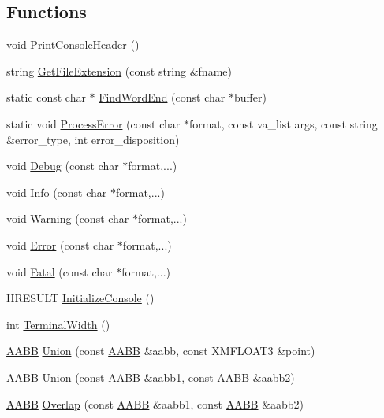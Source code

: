 \subsection*{Functions}
\begin{DoxyCompactItemize}
\item 
void \hyperlink{namespacemage_a064756443bd8a1af6974f22c81d29ed0}{Print\+Console\+Header} ()
\item 
string \hyperlink{namespacemage_aec46035d0a6e15632a44ac88619fb675}{Get\+File\+Extension} (const string \&fname)
\item 
static const char $\ast$ \hyperlink{namespacemage_a81ebde51f9da00dd6fad364a2c5017cb}{Find\+Word\+End} (const char $\ast$buffer)
\item 
static void \hyperlink{namespacemage_a12282bdc04d00e024c5ddf93ed9ad785}{Process\+Error} (const char $\ast$format, const va\+\_\+list args, const string \&error\+\_\+type, int error\+\_\+disposition)
\item 
void \hyperlink{namespacemage_a1bcf1f0301e170105908eee5b5c46830}{Debug} (const char $\ast$format,...)
\item 
void \hyperlink{namespacemage_add6aa5f13960ce07b20f48d273956a91}{Info} (const char $\ast$format,...)
\item 
void \hyperlink{namespacemage_a0eccd8065c75d5f2bf86b48a5be3bfe5}{Warning} (const char $\ast$format,...)
\item 
void \hyperlink{namespacemage_a52a7fe8c9ce39afd9e0b0299373db0fa}{Error} (const char $\ast$format,...)
\item 
void \hyperlink{namespacemage_aefd40c91591a8e0423e4222b4a5e6249}{Fatal} (const char $\ast$format,...)
\item 
H\+R\+E\+S\+U\+LT \hyperlink{namespacemage_a14798232aabfdf96d751f4fcca4e6ece}{Initialize\+Console} ()
\item 
int \hyperlink{namespacemage_a0c12a51bf3468b372932ffc1138a4ddc}{Terminal\+Width} ()
\item 
\hyperlink{structmage_1_1_a_a_b_b}{A\+A\+BB} \hyperlink{namespacemage_aa574a80cb5b7b939962a11c2f423d748}{Union} (const \hyperlink{structmage_1_1_a_a_b_b}{A\+A\+BB} \&aabb, const X\+M\+F\+L\+O\+A\+T3 \&point)
\item 
\hyperlink{structmage_1_1_a_a_b_b}{A\+A\+BB} \hyperlink{namespacemage_ab9b3a22c6c2fc5537f00bf4f7516746f}{Union} (const \hyperlink{structmage_1_1_a_a_b_b}{A\+A\+BB} \&aabb1, const \hyperlink{structmage_1_1_a_a_b_b}{A\+A\+BB} \&aabb2)
\item 
\hyperlink{structmage_1_1_a_a_b_b}{A\+A\+BB} \hyperlink{namespacemage_a1068090c66ff1c6398b134455730eb02}{Overlap} (const \hyperlink{structmage_1_1_a_a_b_b}{A\+A\+BB} \&aabb1, const \hyperlink{structmage_1_1_a_a_b_b}{A\+A\+BB} \&aabb2)

\end{DoxyCompactItemize}
